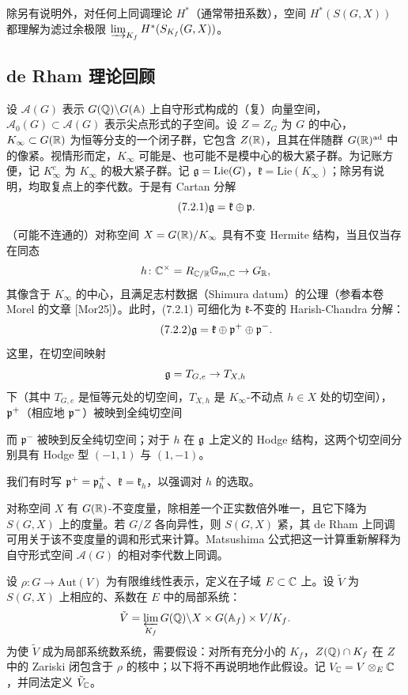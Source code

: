 除另有说明外，对任何上同调理论 $H^*$（通常带扭系数），空间 $H^*(S(G,X))$ 都理解为滤过余极限 $\varinjlim_{K_f}H^*(S_{K_f}(G,X))$。

\subsection{de Rham 理论回顾}

设 $\mathcal A(G)$ 表示 $G(\mathbb{Q})\backslash G(\mathbb{A})$ 上自守形式构成的（复）向量空间，$\mathcal A_0(G)\subset\mathcal A(G)$ 表示尖点形式的子空间。设 $Z=Z_G$ 为 $G$ 的中心，$K_\infty\subset G(\mathbb{R})$ 为恒等分支的一个闭子群，它包含 $Z(\mathbb{R})$，且其在伴随群 $G(\mathbb{R})^{\mathrm{ad}}$ 中的像紧。视情形而定，$K_\infty$ 可能是、也可能不是模中心的极大紧子群。为记账方便，记 $K^c_\infty$ 为 $K_\infty$ 的极大紧子群。记 $\mathfrak{g}=\mathrm{Lie}(G)$，$\mathfrak{k}=\mathrm{Lie}(K_\infty)$；除另有说明，均取复点上的李代数。于是有 Cartan 分解
\begin{equation}\tag{7.2.1}\label{eq:a6-04-11}
\mathfrak{g}=\mathfrak{k}\oplus\mathfrak{p}.
\end{equation}

（可能不连通的）对称空间 $X=G(\mathbb{R})/K_\infty$ 具有不变 Hermite 结构，当且仅当存在同态
\[
h\colon\mathbb{C}^\times=R_{\mathbb{C}/\mathbb{R}}\mathbb G_{m,\mathbb{C}}\to G_{\mathbb{R}},
\]
其像含于 $K_\infty$ 的中心，且满足志村数据（Shimura datum）的公理（参看本卷 Morel 的文章 [Mor25]）。此时，(7.2.1) 可细化为 $\mathfrak{k}$-不变的 Harish-Chandra 分解：
\begin{equation}\tag{7.2.2}\label{eq:a6-04-12}
\mathfrak{g}=\mathfrak{k}\oplus\mathfrak{p}^+\oplus\mathfrak{p}^-.
\end{equation}
这里，在切空间映射
\[
\mathfrak{g}=T_{G,e}\to T_{X,h}
\]
下（其中 $T_{G,e}$ 是恒等元处的切空间，$T_{X,h}$ 是 $K_\infty$-不动点 $h\in X$ 处的切空间），$\mathfrak{p}^+$（相应地 $\mathfrak{p}^-$）被映到全纯切空间


而 $\mathfrak p^-$ 被映到反全纯切空间；对于 $h$ 在 $\mathfrak{g}$ 上定义的 Hodge 结构，这两个切空间分别具有 Hodge 型 $(-1,1)$ 与 $(1,-1)$。

我们有时写 $\mathfrak{p}^+=\mathfrak{p}^+_h$、$\mathfrak{k}=\mathfrak{k}_h$，以强调对 $h$ 的选取。

对称空间 $X$ 有 $G(\mathbb{R})$-不变度量，除相差一个正实数倍外唯一，且它下降为 $S(G,X)$ 上的度量。若 $G/Z$ 各向异性，则 $S(G,X)$ 紧，其 de Rham 上同调可用关于该不变度量的调和形式来计算。Matsushima 公式把这一计算重新解释为自守形式空间 $\mathcal A(G)$ 的相对李代数上同调。

设 $\rho\colon G\to\mathrm{Aut}(V)$ 为有限维线性表示，定义在子域 $E\subset\mathbb{C}$ 上。设 $\tilde V$ 为 $S(G,X)$ 上相应的、系数在 $E$ 中的局部系统：
\[
\tilde V=\varprojlim_{K_f}G(\mathbb{Q})\backslash X\times G(\mathbb{A}_f)\times V/K_f.
\]
为使 $\tilde V$ 成为局部系统数系统，需要假设：对所有充分小的 $K_f$，$Z(\mathbb{Q})\cap K_f$ 在 $Z$ 中的 Zariski 闭包含于 $\rho$ 的核中；以下将不再说明地作此假设。记 $V_{\mathbb{C}}=V\otimes_E\mathbb{C}$，并同法定义 $\tilde V_{\mathbb{C}}$。

